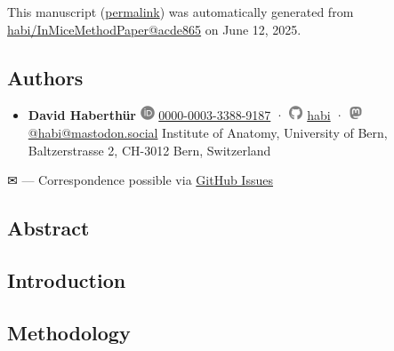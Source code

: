 This manuscript
(\href{https://habi.github.io/InMiceMethodPaper/v/acde865f8ef922e8de8cb510045a249eef445fe9/}{permalink})
was automatically generated
from \href{https://github.com/habi/InMiceMethodPaper/tree/acde865f8ef922e8de8cb510045a249eef445fe9}{habi/InMiceMethodPaper@acde865}
on June 12, 2025.

\hypertarget{authors}{%
\subsection{Authors}\label{authors}}

\begin{itemize}
\tightlist
\item
  \textbf{David Haberthür}
  \includegraphics[width=0.16667in,height=0.16667in]{images/orcid.svg}
  \href{https://orcid.org/0000-0003-3388-9187}{0000-0003-3388-9187}
  · \includegraphics[width=0.16667in,height=0.16667in]{images/github.svg}
  \href{https://github.com/habi}{habi}
  · \includegraphics[width=0.16667in,height=0.16667in]{images/mastodon.svg}
  \href{https://mastodon.social/@habi}{@habi@mastodon.social}
  Institute of Anatomy, University of Bern, Baltzerstrasse 2, CH-3012 Bern, Switzerland
\end{itemize}

\leavevmode{}%
✉ --- Correspondence possible via \href{https://github.com/habi/InMiceMethodPaper/issues}{GitHub Issues}

\hypertarget{abstract}{%
\subsection{Abstract}\label{abstract}}

\hypertarget{introduction}{%
\subsection{Introduction}\label{introduction}}

\hypertarget{methodology}{%
\subsection{Methodology}\label{methodology}}

